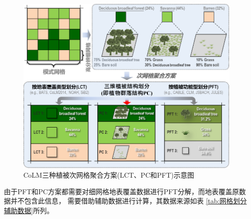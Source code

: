 {
\begin{figure}[]
\centering
\includegraphics{Figures/地表输入数据/次网格聚合方案.png}
\caption{CoLM三种植被次网格聚合方案(LCT、PC和PFT)示意图}
\label{fig:次网格聚合方案}
\end{figure}
}


由于PFT和PC方案都需要对细网格地表覆盖数据进行PFT分解，而地表覆盖原数据并不包含此信息，
需要借助辅助数据进行计算，其数据来源如表 \ref{tab:网格划分辅助数据}所列。


